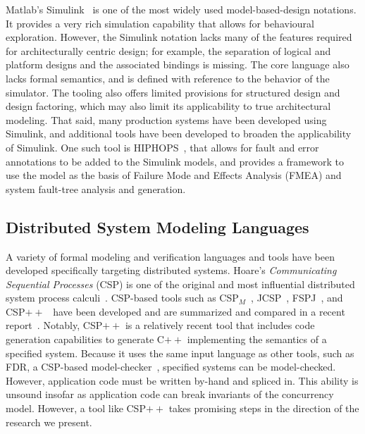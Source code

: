 Matlab's Simulink~\cite{simulink} is  one of the most widely used
model-based-design notations. It provides a very rich
simulation capability that allows for behavioural exploration. However, the
Simulink notation lacks many of the features required for architecturally
centric design; for example, the separation of logical and platform designs and
the associated bindings is missing. The core language also lacks formal
semantics, and is defined with reference to the behavior of the simulator. The
tooling also offers limited provisions for structured design and design
factoring, which may also limit its applicability to true architectural
modeling.    That said, many production systems have been developed using Simulink, and additional tools have been developed to broaden the
applicability of Simulink.   One such tool is HIPHOPS~\cite{papadopoulos2011engineering}, that allows for fault and error annotations to be added to the Simulink models, and provides a framework to use the model as the basis of Failure Mode and Effects Analysis (FMEA) and system fault-tree analysis and generation.
 



\subsection{Distributed System Modeling Languages}
A variety of formal modeling and verification languages and tools have been
developed specifically targeting distributed systems.  Hoare's
\emph{Communicating Sequential Processes} (CSP) is one of the original and most
influential distributed system process calculi~\cite{csp}. CSP-based tools such as
CSP$_M$~\cite{cspm}, JCSP~\cite{jcsp}, FSPJ~\cite{fspj}, and
CSP$++$~\cite{cspplus} have been developed and are summarized and compared in a
recent report~\cite{csp-masters}. Notably, CSP$++$ is a relatively recent tool
that includes code generation capabilities to generate C$++$ implementing the
semantics of a specified system. Because it uses the same input language as
other tools, such as FDR, a CSP-based model-checker~\cite{fdr}, specified
systems can be model-checked. However, application code must be written by-hand
and spliced in. This ability is unsound insofar as application code can break
invariants of the concurrency model. However, a tool like CSP$++$ takes
promising steps in the direction of the research we present.

